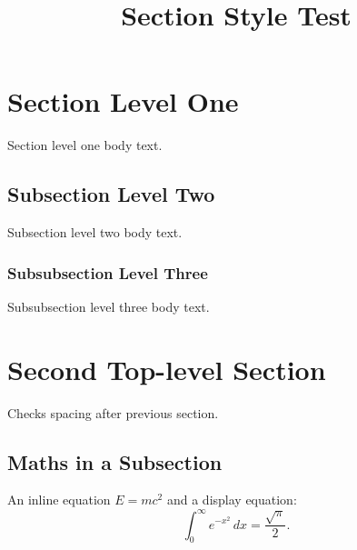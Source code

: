 \documentclass{SUSTechHomework}
\title{Section Style Test}
\begin{document}
\maketitle

\section{Section Level One}
Section level one body text.

\subsection{Subsection Level Two}
Subsection level two body text.

\subsubsection{Subsubsection Level Three}
Subsubsection level three body text.

\section{Second Top-level Section}
Checks spacing after previous section.

\subsection{Maths in a Subsection}
An inline equation \( E = mc^2 \) and a display equation:
\[
  \int_0^\infty e^{-x^2}\,dx = \frac{\sqrt{\pi}}{2}.
\]
\end{document}
